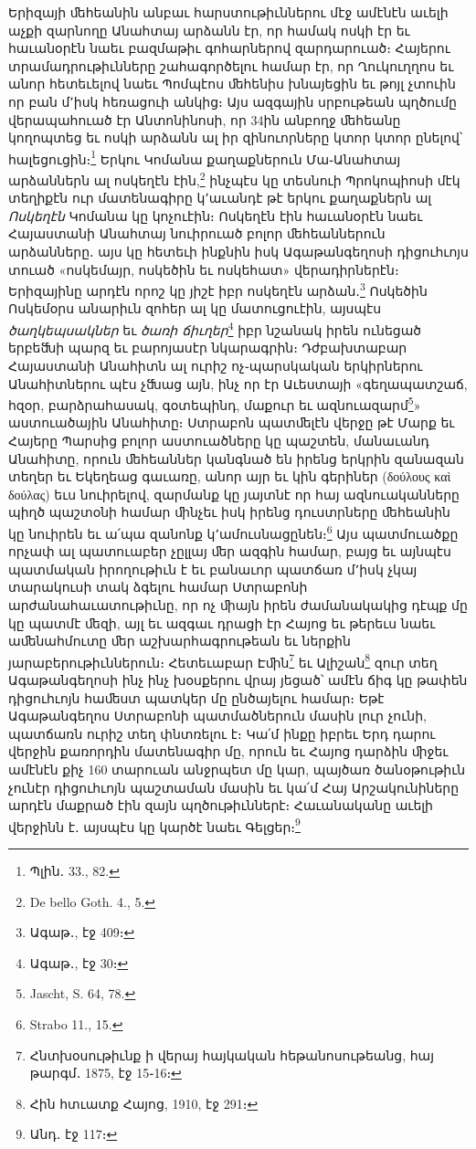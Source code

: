 \documentclass{article}
\begin{document}
{Երիզայի ﬔհեանին անբաւ հարստութիւններու մէջ ամէնէն աւելի աչքի զարնողը Անահտայ արձանն էր, որ համակ ոսկի էր եւ հաւանօրէն նաեւ բազմաթիւ գոհարներով զարդարուած։ Հայերու տրամադրութիւնները շահագործելու համար էր, որ Ղուկուղղոս եւ անոր հետեւելով նաեւ Պոմպէոս ﬔհենիս խնայեցին եւ թոյլ չտուին որ բան մ՚իսկ հեռացուի անկից։ Այս ազգային սրբութեան պղծումը վերապահուած էր Անտոնինոսի, որ 34ին անբողջ ﬔհեանը կողոպտեց եւ ոսկի արձանն ալ իր զինուորները կտոր կտոր ընելով՝ հալեցուցին։\footnote{Պլին․ 33., 82.} Երկու Կոմանա քաղաքներուն Մա֊Անահտայ արձաններն ալ ոսկեղէն էին,\footnote{De bello Goth. 4., 5.} ինչպէս կը տեսնուի Պրոկոպիոսի մէկ տեղիքէն ուր մատենագիրը կ՚աւանդէ թէ երկու քաղաքներն ալ \emph{Ոսկեղէն} Կոմանա կը կոչուէին։ Ոսկեղէն էին հաւանօրէն նաեւ Հայաստանի Անահտայ նուիրուած բոլոր ﬔհեաններուն արձանները․ այս կը հետեւի ինքնին իսկ Ագաթանգեղոսի դիցուհւոյս տուած «ոսկեմայր, ոսկեծին եւ ոսկեհատ» վերադիրներէն։ Երիզայինը արդէն որոշ կը յիշէ իբր ոսկեղէն արձան․\footnote{Ագաթ․, էջ 409։} Ոսկեծին Ոսկեմօրս անարիւն զոհեր ալ կը մատուցուէին, այսպէս \emph{ծաղկեպսակներ} եւ \emph{ծառի ճիւղեր}\footnote{Ագաթ․, էջ 30։} իբր նշանակ իրեն ունեցած երբեﬓի պարզ եւ բարոյասէր նկարագրին։ Դժբախտաբար Հայաստանի Անահիտն ալ ուրիշ ոչ֊պարսկական երկիրներու Անահիտներու պէս չﬓաց այն, ինչ որ էր Աւեստայի «գեղապատշաճ, հզօր, բարձրահասակ, գօտեպինդ, մաքուր եւ ազնուազարմ\footnote{Jascht, S. 64, 78.}» աստուածային Անահիտը։ Ստրաբոն պատﬔլէն վերջը թէ Մարք եւ Հայերը Պարսից բոլոր աստուածները կը պաշտեն, մանաւանդ Անահիտը, որուն ﬔհեաններ կանգնած են իրենց երկրին զանազան տեղեր եւ Եկեղեաց գաւառը, անոր այր եւ կին գերիներ (δούλους καὶ δούλας) եւս նուիրելով, զարմանք կը յայտնէ որ հայ ազնուականները պիղծ պաշտօնի համար ﬕնչեւ իսկ իրենց դուստրները ﬔհեանին կը նուիրեն եւ ա՛պա զանոնք կ՚ամուսնացընեն։\footnote{Strabo 11., 15.} Այս պատմուածքը որչափ ալ պատուաբեր չըլլայ ﬔր ազգին համար, բայց եւ այնպէս պատմական իրողութիւն է եւ բանաւոր պատճառ մ՚իսկ չկայ տարակուսի տակ ձգելու համար Ստրաբոնի արժանահաւատութիւնը, որ ոչ ﬕայն իրեն ժամանակակից դէպք մը կը պատմէ ﬔզի, այլ եւ ազգաւ դրացի էր Հայոց եւ թերեւս նաեւ աﬔնահմուտը ﬔր աշխարհագրութեան եւ ներքին յարաբերութիւններուն։ Հետեւաբար Էﬕն\footnote{Հնտխօսութիւնք ի վերայ հայկական հեթանոսութեանց, հայ թարգմ․ 1875, էջ 15֊16։} եւ Ալիշան\footnote{Հին հտւատք Հայոց, 1910, էջ 291։} զուր տեղ Ագաթանգեղոսի ինչ ինչ խօսքերու վրայ յեցած՝ ամէն ճիգ կը թափեն դիցուհւոյն հաﬔստ պատկեր մը ընծայելու համար։ Եթէ Ագաթանգեղոս Ստրաբոնի պատմածներուն մասին լուր չունի, պատճառն ուրիշ տեղ փնտռելու է։ Կա՛մ ինքը իբրեւ Երդ դարու վերջին քառորդին մատենագիր մը, որուն եւ Հայոց դարձին ﬕջեւ ամէնէն քիչ 160 տարուան անջրպետ մը կար, պայծառ ծանօթութիւն չունէր դիցուհւոյն պաշտաման մասին եւ կա՛մ Հայ Արշակունիները արդէն մաքրած էին զայն պղծութիւններէ։ Հաւանականը աւելի վերջինն է․ այսպէս կը կարծէ նաեւ Գելցեր։\footnote{Անդ․ էջ 117։}

}
\end{document}
